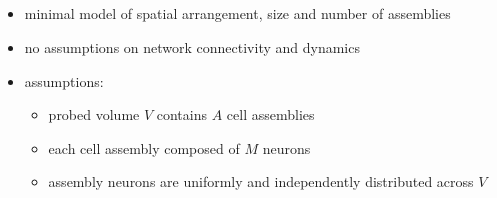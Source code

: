 \documentclass[8pt,t,usepdftitle=false]{beamer}
\begin{document}
\subsection{\sttl}
\begin{frame}[plain]
  \frametitle{\ttl}
  \framesubtitle{\sttl}
  \begin{itemize}
  \item<1-> minimal model of spatial arrangement, size and number of assemblies
  \item<1-> no assumptions on network connectivity and dynamics\\[2ex]
  \item<2-> assumptions:
    \begin{itemize}\itemsep1ex
    \item probed volume $V$ contains $A$ cell assemblies
    \item each cell assembly composed of $M$ neurons
    \item assembly neurons are uniformly and independently distributed across $V$
    \end{itemize}
  \end{itemize}
\end{frame}
\def\ttl{Pattern statistics}
\end{document}
